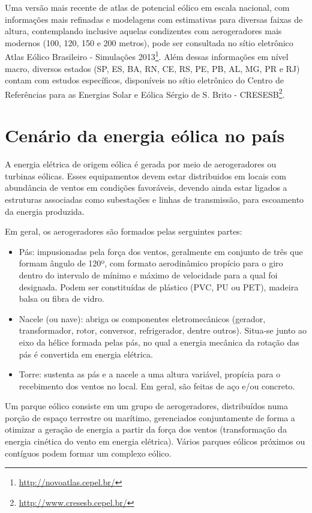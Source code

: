 \documentclass[
  oneside]{scrbook}
\DeclareRobustCommand{\href}[2]{#2\footnote{\url{#1}}}
\begin{document}
Uma versão mais recente de atlas de potencial eólico em escala nacional, com informações mais refinadas e modelagens com estimativas para diversas faixas de altura, contemplando inclusive aquelas condizentes com aerogeradores mais modernos (100, 120, 150 e 200 metros), pode ser consultada no sítio eletrônico \href{http://novoatlas.cepel.br/}{Atlas Eólico Brasileiro - Simulações 2013}. Além dessas informações em nível macro, diversos estados (SP, ES, BA, RN, CE, RS, PE, PB, AL, MG, PR e RJ) contam com estudos específicos, disponíveis no sítio eletrônico do \href{http://www.cresesb.cepel.br/}{Centro de Referências para as Energias Solar e Eólica Sérgio de S. Brito - CRESESB}.

\hypertarget{cenuxe1rio-da-energia-euxf3lica-no-pauxeds}{%
\section{Cenário da energia eólica no país}\label{cenuxe1rio-da-energia-euxf3lica-no-pauxeds}}

A energia elétrica de origem eólica é gerada por meio de aerogeradores ou turbinas eólicas. Esses equipamentos devem estar distribuidos em locais com abundância de ventos em condições favoráveis, devendo ainda estar ligados a estruturas associadas como subestações e linhas de transmissão, para escoamento da energia produzida.

Em geral, os aerogeradores são formados pelas serguintes partes:

\begin{itemize}
\item
  Pás: impusionadas pela força dos ventos, geralmente em conjunto de três que formam ângulo de 120º, com formato aerodinâmico propício para o giro dentro do intervalo de mínimo e máximo de velocidade para a qual foi designada. Podem ser constituídas de plástico (PVC, PU ou PET), madeira balsa ou fibra de vidro.
\item
  Nacele (ou nave): abriga os componentes eletromecânicos (gerador, transformador, rotor, conversor, refrigerador, dentre outros). Situa-se junto ao eixo da hélice formada pelas pás, no qual a energia mecânica da rotação das pás é convertida em energia elétrica.
\item
  Torre: sustenta as pás e a nacele a uma altura variável, propícia para o recebimento dos ventos no local. Em geral, são feitas de aço e/ou concreto.
\end{itemize}

Um parque eólico consiste em um grupo de aerogeradores, distribuídos numa porção de espaço terrestre ou marítimo, gerenciados conjuntamente de forma a otimizar a geração de energia a partir da força dos ventos (transformação da energia cinética do vento em energia elétrica). Vários parques eólicos próximos ou contíguos podem formar um complexo eólico.
\end{document}
